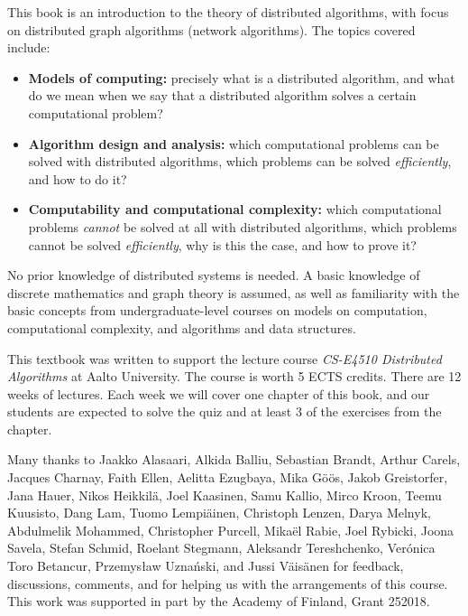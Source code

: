 
This book is an introduction to the theory of distributed algorithms, with focus on distributed graph algorithms (network algorithms). The topics covered include:
\begin{itemize}
    \item \textbf{Models of computing:} precisely what is a distributed algorithm, and what do we mean when we say that a distributed algorithm solves a certain computational problem?
    \item \textbf{Algorithm design and analysis:} which computational problems can be solved with distributed algorithms, which problems can be solved \emph{efficiently}, and how to do it?
    \item \textbf{Computability and computational complexity:} which computational problems \emph{cannot} be solved at all with distributed algorithms, which problems cannot be solved \emph{efficiently}, why is this the case, and how to prove it?
\end{itemize}
No prior knowledge of distributed systems is needed. A basic knowledge of discrete mathematics and graph theory is assumed, as well as familiarity with the basic concepts from undergraduate-level courses on models on computation, computational complexity, and algorithms and data structures.



This textbook was written to support the lecture course \emph{CS-E4510 Distributed Algorithms} at Aalto University. The course is worth 5 ECTS credits. There are 12 weeks of lectures. Each week we will cover one chapter of this book, and our students are expected to solve the quiz and at least 3 of the exercises from the chapter.



Many thanks to
Jaak\-ko Ala\-saari,
Alki\-da Balliu,
Sebastian Brandt,
Arthur Carels,
Jacques Charnay,
Faith Ellen,
Aelitta Ezugbaya,
Mika G\"o\"os,
Ja\-kob Greistorfer,
Jana Hauer,
Nikos Heik\-kil\"a,
Joel Kaa\-si\-nen,
Samu Kal\-lio,
Mir\-co Kroon,
Tee\-mu Kuu\-sisto,
Dang Lam,
Tuo\-mo Lem\-pi\"a\-inen,
Christoph Len\-zen,
Darya Melnyk,
Abdul\-melik Mohammed,
Christopher Purcell,
Mika\"el Rabie,
Joel Ry\-bicki,
Joo\-na Sa\-ve\-la,
Stefan Schmid,
Roelant Steg\-mann,
Aleksandr Tereshchenko,
Verónica Toro Betancur,
Przemys\l{}aw Uzna\'nski,
and
Jussi V\"ai\-s\"a\-nen
for feedback, discussions, comments, and for helping us with the arrangements of this course. This work was supported in part by the Academy of Finland, Grant 252018.


